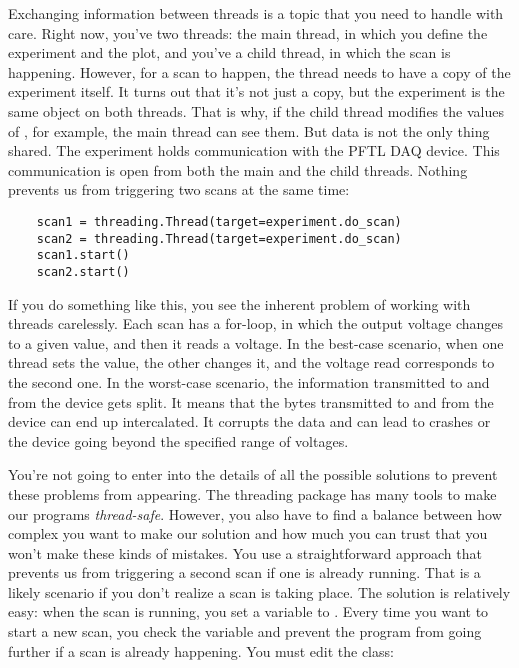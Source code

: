 Exchanging information between threads is a topic that you need to handle with care. Right now, you've two threads: the main thread, in which you define the experiment and the plot, and you've a child thread, in which the scan is happening. However, for a scan to happen, the thread needs to have a copy of the experiment itself. It turns out that it's not just a copy, but the experiment is the same object on both threads. That is why, if the child thread modifies the values of , for example, the main thread can see them. But data is not the only thing shared. The experiment holds communication with the {PFTL DAQ} device. This communication is open from both the main and the child threads. Nothing prevents us from triggering two scans at the same time:

\begin{verbatim}
    scan1 = threading.Thread(target=experiment.do_scan)
    scan2 = threading.Thread(target=experiment.do_scan)
    scan1.start()
    scan2.start()
\end{verbatim}

If you do something like this, you see the inherent problem of working with threads carelessly. Each scan has a for-loop, in which the output voltage changes to a given value, and then it reads a voltage. In the best-case scenario, when one thread sets the value, the other changes it, and the voltage read corresponds to the second one. In the worst-case scenario, the information transmitted to and from the device gets split. It means that the bytes transmitted to and from the device can end up intercalated. It corrupts the data and can lead to crashes or the device going beyond the specified range of voltages.

You're not going to enter into the details of all the possible solutions to prevent these problems from appearing. The threading package has many tools to make our programs \emph{thread-safe}. However, you also have to find a balance between how complex you want to make our solution and how much you can trust that you won't make these kinds of mistakes. You use a straightforward approach that prevents us from triggering a second scan if one is already running. That is a likely scenario if you don't realize a scan is taking place. The solution is relatively easy: when the scan is running, you set a variable to . Every time you want to start a new scan, you check the variable and prevent the program from going further if a scan is already happening. You must edit the  class:

